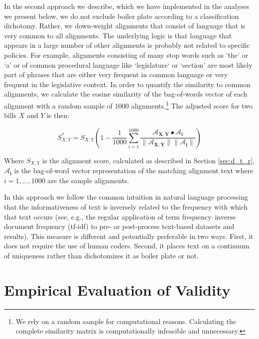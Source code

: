 \documentclass[12pt]{article} %
\begin{document}
In the second approach we describe, which we have implemented in the analyses we present below, we do not exclude boiler plate according to a classification dichotomy.
Rather, we down-weight alignments that consist of language that is
very common to all alignments. The underlying logic is that language that
appears in a large number of other alignments is probably not related to
specific policies. For example, alignments consisting of many stop words such as
`the' or `a' or of common procedural language like `legislature` or `section'
are most likely part of phrases that are either very frequent in common language
or very frequent in the legislative context. 
In order to quantify the similarity to common alignments, we calculate the
cosine similarity of the bag-of-words vector of each alignment with a random
sample of 1000 alignments.\footnote{We rely on a random sample for computational
reasons. Calculating the complete similarity matrix is computationally
infeasible and unnecessary.} The adjusted score for two bills $X$ and $Y$ is
then:

\begin{equation}
    S^*_{X,Y} = S_{X,Y} \left(1 -
    \frac{1}{1000}\sum_{i=1}^{1000}\frac{\mathbf{\mathcal{A}_{X,Y}} \bullet
    {\mathbf{\mathcal{A}_i}}}{\lVert\mathbf{\mathcal{A}_{X,Y}\rVert\lVert\mathbf{\mathcal{A}_i}}\rVert}\right)
\end{equation}

Where $S_{X,Y}$ is the alignment score, calculated as described in Section \ref{sec:d_t_r},
$\mathbf{\mathcal{A}_i}$ is the bag-of-word vector representation of the
matching alignment text where $i = 1,\dots,1000$ are the sample alignments.

In this approach we follow the common intuition in natural language processing that the informativeness of text is inversely related to the frequency with which that text occurs \citep{robertson2004understanding} (see, e.g., the regular application of term frequency--inverse document frequency (tf-idf) to pre- or post-process text-based datasets and results). This measure is different and potentially preferable in two ways. First, it does not require the use of human coders. Second, it places text on a continuum of uniqueness rather than dichotomizes it as boiler plate or not.


\section{Empirical Evaluation of Validity}
\end{document}
